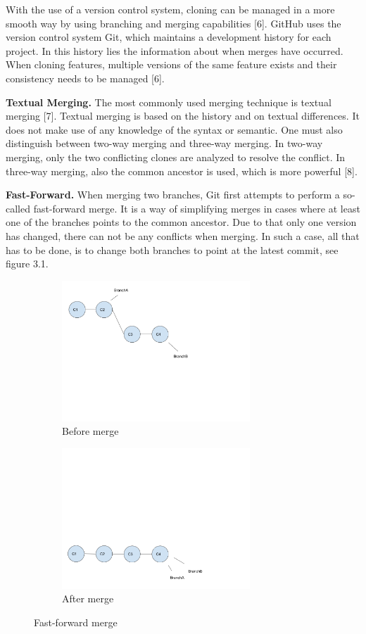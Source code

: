 With the use of a version control system, cloning can be managed in a more smooth way by using branching and merging capabilities [6]. GitHub uses the version control system Git, which maintains a development history for each project. In this history lies the information about when merges have occurred. When cloning features, multiple versions of the same feature exists and their consistency needs to be managed [6].

\textbf{Textual Merging.} The most commonly used merging technique is textual merging [7]. Textual merging is based on the history and on textual differences. It does not make use of any knowledge of the syntax or semantic. One must also distinguish between two-way merging and three-way merging. In two-way merging, only the two conflicting clones are analyzed to resolve the conflict. In three-way merging, also the common ancestor is used, which is more powerful [8].

\textbf{Fast-Forward.} When merging two branches, Git first attempts to perform a so-called fast-forward merge. It is a way of simplifying merges in cases where at least one of the branches points to the common ancestor. Due to that only one version has changed, there can not be any conflicts when merging. In such a case, all that has to be done, is to change both branches to point at the latest commit, see figure 3.1.
\begin{figure}[h]
   \centering
   \begin{subfigure}[b]{0.3\textwidth}
       \includegraphics[width=200pt]{figure/ff1.png}
       \caption{Before merge}
       \label{fig:branch1}
   \end{subfigure}
   \begin{subfigure}[b]{0.3\textwidth}
       \includegraphics[width=200pt]{figure/ff2.png}
       \caption{After merge}
       \label{fig:branch3}
   \end{subfigure}
   \caption{Fast-forward merge}\label{fig:fastforward}
\end{figure}

